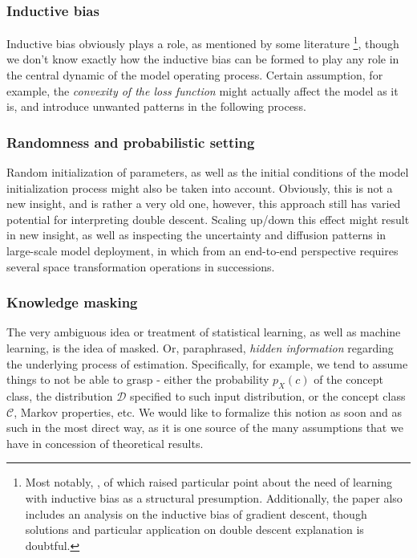 \documentclass[twoside,10pt]{article}
\begin{document}
\subsubsection{Inductive bias}
Inductive bias obviously plays a role, as mentioned by some literature \footnote{Most notably, \cite{lafon_understanding_2024}, of which raised particular point about the need of learning with inductive bias as a structural presumption. Additionally, the paper also includes an analysis on the inductive bias of gradient descent, though solutions and particular application on double descent explanation is doubtful.}, though we don't know exactly how the inductive bias can be formed to play any role in the central dynamic of the model operating process. Certain assumption, for example, the \textit{convexity of the loss function} might actually affect the model as it is, and introduce unwanted patterns in the following process. 
\subsubsection{Randomness and probabilistic setting}
Random initialization of parameters, as well as the initial conditions of the model initialization process might also be taken into account. Obviously, this is not a new insight, and is rather a very old one, however, this approach still has varied potential for interpreting double descent. Scaling up/down this effect might result in new insight, as well as inspecting the uncertainty and diffusion patterns in large-scale model deployment, in which from an end-to-end perspective requires several space transformation operations in successions.
\subsubsection{Knowledge masking}
The very ambiguous idea or treatment of statistical learning, as well as machine learning, is the idea of masked. Or, paraphrased, \textit{hidden information} regarding the underlying process of estimation. Specifically, for example, we tend to assume things to not be able to grasp - either the probability $p_{X}(c)$ of the concept class, the distribution $\mathcal{D}$ specified to such input distribution, or the concept class $\mathcal{C}$, Markov properties, etc. We would like to formalize this notion as soon and as such in the most direct way, as it is one source of the many assumptions that we have in concession of theoretical results. 

\clearpage
\end{document}
